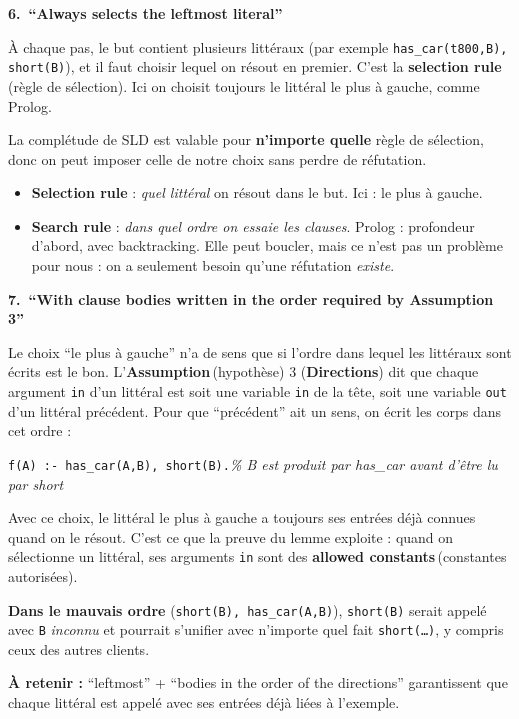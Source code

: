 \documentclass[10pt]{article}
\newcommand{\EN}[2]{\textbf{#1}\,{\scriptsize\textcolor{marine}{(#2)}}}
\newcommand{\titrebox}[2]{\needspace{10\baselineskip}\vspace{8pt}
  \begin{tcolorbox}[colback=marine, colframe=marine, arc=0pt, boxrule=0pt,
    top=4pt, bottom=4pt, left=8pt]
  \color{white}\Large\bfseries #1.~#2
  \end{tcolorbox}\vspace{2pt}}
\newcommand{\ce}[1]{\begin{pourquoi}\textbf{\textcolor{marine}{À retenir :}} #1\end{pourquoi}}
\newcommand{\st}[1]{\par\needspace{7\baselineskip}\vspace{5pt}{\normalsize\bfseries\textcolor{marine}{#1}}\par\vspace{2pt}}
\begin{document}
\titrebox{6}{``Always selects the leftmost literal''}
À chaque pas, le but contient plusieurs littéraux (par exemple \texttt{has\_car(t800,B), short(B)}), et il faut
choisir lequel on résout en premier. C'est la \EN{selection rule}{règle de sélection}. Ici on choisit toujours
le littéral le plus à gauche, comme Prolog.\par\vspace{3pt}
La complétude de SLD est valable pour \textbf{n'importe quelle} règle de sélection, donc on peut imposer celle
de notre choix sans perdre de réfutation.

\st{Selection rule $\neq$ search rule}
\begin{itemize}
  \item \textbf{Selection rule} : \emph{quel littéral} on résout dans le but. Ici : le plus à gauche.
  \item \textbf{Search rule} : \emph{dans quel ordre on essaie les clauses}. Prolog : profondeur d'abord, avec backtracking.
        Elle peut boucler, mais ce n'est pas un problème pour nous : on a seulement besoin qu'une réfutation \emph{existe}.
\end{itemize}

\titrebox{7}{``With clause bodies written in the order required by Assumption 3''}
Le choix ``le plus à gauche'' n'a de sens que si l'ordre dans lequel les littéraux sont écrits est le bon.
L'\EN{Assumption}{hypothèse} 3 (\textbf{Directions}) dit que chaque argument \texttt{in} d'un littéral est soit
une variable \texttt{in} de la tête, soit une variable \texttt{out} d'un littéral précédent. Pour que
``précédent'' ait un sens, on écrit les corps dans cet ordre :
\begin{moi}
\texttt{f(A) :- has\_car(A,B), short(B).}\quad \textit{\% B est produit par has\_car avant d'être lu par short}
\end{moi}
Avec ce choix, le littéral le plus à gauche a toujours ses entrées déjà connues quand on le résout. C'est ce
que la preuve du lemme exploite : quand on sélectionne un littéral, ses arguments \texttt{in} sont des
\EN{allowed constants}{constantes autorisées}.
\begin{piege}
\textbf{Dans le mauvais ordre} (\texttt{short(B), has\_car(A,B)}), \texttt{short(B)} serait appelé avec
\texttt{B} \emph{inconnu} et pourrait s'unifier avec n'importe quel fait \texttt{short(\ldots)}, y compris
ceux des autres clients.
\end{piege}
\ce{``leftmost'' + ``bodies in the order of the directions'' garantissent que chaque littéral est appelé
avec ses entrées déjà liées à l'exemple.}
\end{document}
